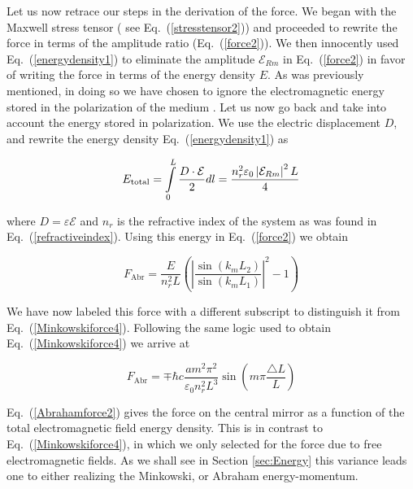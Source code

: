 Let us now retrace our steps in the derivation of the force.  We began with the Maxwell stress tensor ( see Eq.\ (\ref{stresstensor2})) and proceeded to rewrite the force in terms of the amplitude ratio (Eq.\ (\ref{force2})).  We then innocently used Eq.\ (\ref{energydensity1}) to eliminate the amplitude $\mathcal{E}_{Rm}$ in Eq.\ (\ref{force2}) in favor of writing the force in terms of the energy density $E$. As was previously mentioned, in doing so we have chosen to ignore the electromagnetic energy stored in the polarization of the medium \cite{griffiths}. Let us now go back and take into account the energy stored in polarization. We use the electric displacement $D$, and rewrite the energy density Eq.\ (\ref{energydensity1}) as \cite{griffiths}

\begin{equation}
E_{\mathrm{total}}=\intop_{0}^{L}\frac{D\cdot \mathcal{E}}{2}dl=\frac{n_{r}^{2}\varepsilon_{0}\left| \mathcal{E}_{Rm}\right|^{2}L}{4}
\label{energydensity2}
\end{equation}

where $D=\varepsilon \mathcal{E}$ and $n_{r}$ is the refractive index of the system as was found in Eq.\ (\ref{refractiveindex}).
Using this energy in Eq.\ (\ref{force2}) we obtain

\begin{equation}
F_{\mathrm{Abr}}=\frac{E}{n_{r}^{2}L}\left(\left|\frac{\sin(k_{m}L_{2})}{\sin(k_{m}L_{1})}\right|^{2}-1\right)
\label{Abrahamforce1}
\end{equation}

We have now labeled this force with a different subscript to distinguish it from Eq.\ (\ref{Minkowskiforce4}).  
Following the same logic used to obtain Eq.\ (\ref{Minkowskiforce4}) we arrive at 

\begin{equation}
F_{\mathrm{Abr}}=\mp\hbar c\frac{a m^{2}\pi^{2}}{\varepsilon_{0}n_{r}^{2}L^{3}}\sin(m\pi\frac{\triangle L}{L})
\label{Abrahamforce2}
\end{equation}

Eq.\ (\ref{Abrahamforce2}) gives the force on the central mirror as a function of the total electromagnetic field energy density.  This is in contrast to Eq.\ (\ref{Minkowskiforce4}), in which we only selected for the force due to free electromagnetic fields.  As we shall see in Section \ref{sec:Energy} this variance leads one to either realizing the Minkowski, or Abraham energy-momentum.  



